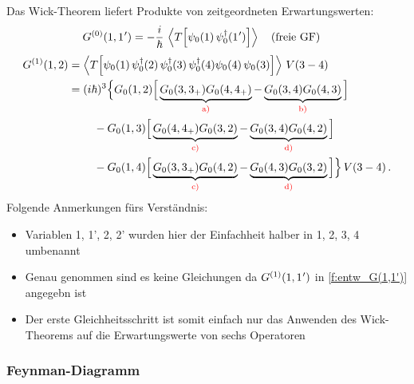 Das Wick-Theorem liefert Produkte von zeitgeordneten Erwartungswerten:
\begin{align}
  G^{(0)}(1,1\mkern1mu')
   & = -\frac{i}{\hbar}\,\left\langle T\!\left[\psi_0(1)\,\psi_0^\dagger(1\mkern1mu')\right]\right\rangle
  \quad \text{(freie GF)}
\end{align}
\begin{equation}
  \begin{aligned}
    G^{(1)}(1,2)
     & = \left\langle T\!\left[\psi_0(1)\,\psi_0^\dagger(2)\,\psi_0^\dagger(3)\,\psi_0^\dagger(4)\psi_0(4)\,\psi_0(3)\right]\right\rangle\,V(3-4) \\
     & = (i\hbar)^3\Big\{
    G_0(1,2)\Big[
              \underbrace{G_0(3,3_+)G_0(4,4_+)}_{\textcolor{red}{\text{a)}}}
              -
              \underbrace{G_0(3,4)G_0(4,3)}_{\textcolor{red}{\text{b)}}}
              \Big]                                                   \\
     & \qquad\;
    - G_0(1,3)\Big[
                \underbrace{G_0(4,4_+)G_0(3,2)}_{\textcolor{red}{\text{c)}}}
                -
                \underbrace{G_0(3,4)G_0(4,2)}_{\textcolor{red}{\text{d)}}}
                \Big]                                                   \\
     & \qquad\;
    - G_0(1,4)\Big[
                \underbrace{G_0(3,3_+)G_0(4,2)}_{\textcolor{red}{\text{c)}}}
                -
                \underbrace{G_0(4,3)G_0(3,2)}_{\textcolor{red}{\text{d)}}}
                \Big]
    \Big\}\,V(3-4)\,.
  \end{aligned}
\end{equation}
Folgende Anmerkungen fürs Verständnis:
\begin{itemize}
  \item Variablen 1, 1', 2, 2' wurden hier der Einfachheit halber in 1, 2, 3, 4 umbenannt
  \item Genau genommen sind es keine Gleichungen da $G^{(1)}(1,1\mkern1mu')$ in \autoref{f:entw_G(1,1')} angegebn ist
  \item Der erste Gleichheitsschritt ist somit einfach nur das Anwenden des Wick-Theorems auf die Erwartungswerte von sechs Operatoren
\end{itemize}

\subsubsection*{Feynman-Diagramm}

